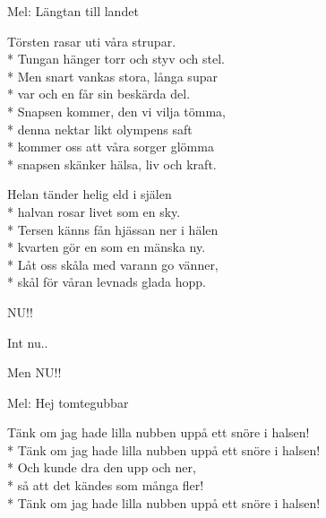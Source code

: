 \begin{SongText}
    \begin{SongInfo}
        Mel: Längtan till landet
    \end{SongInfo}
    \begin{SongVerse}
        Törsten rasar uti våra strupar.\\*%
        Tungan hänger torr och styv och stel.\\*%
        Men snart vankas stora, långa supar\\*%
        var och en får sin beskärda del.\\*%
        Snapsen kommer, den vi vilja tömma,\\*%
        denna nektar likt olympens saft\\*%
        kommer oss att våra sorger glömma\\*%
        snapsen skänker hälsa, liv och kraft.
    \end{SongVerse}
    \begin{SongVerse}
        Helan tänder helig eld i själen\\*%
        halvan rosar livet som en sky.\\*%
        Tersen känns fån hjässan ner i hälen\\*%
        kvarten gör en som en mänska ny.\\*%
        Låt oss skåla med varann go vänner,\\*%
        skål för våran levnads glada hopp.
    \end{SongVerse}
\end{SongText}
\begin{SongText}
    \begin{SongVerse}
        NU!!
    \end{SongVerse}
\end{SongText}
\begin{SongText}
    \begin{SongVerse}
        Int nu..
    \end{SongVerse}
    \begin{SongVerse}
        Men NU!!
    \end{SongVerse}
\end{SongText}
\begin{SongText}[Snöret]
    \begin{SongInfo}
        Mel: Hej tomtegubbar
    \end{SongInfo}
    \begin{SongVerse}
        Tänk om jag hade lilla nubben uppå ett snöre i halsen!\\*%
        Tänk om jag hade lilla nubben uppå ett snöre i halsen!\\*%
        Och kunde dra den upp och ner,\\*%
        så att det kändes som många fler!\\*%
        Tänk om jag hade lilla nubben uppå ett snöre i halsen!
    \end{SongVerse}
\end{SongText}
